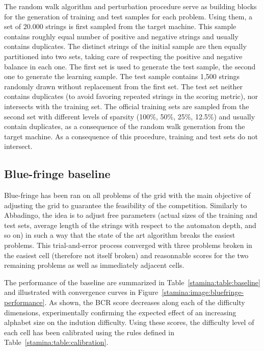 The random walk algorithm and perturbation procedure serve as building blocks for the generation of training and test samples for each problem. Using them, a set of 20.000 strings is first sampled from the target machine. This sample contains roughly equal number of positive and negative strings and usually contains duplicates. The distinct strings of the initial sample are then equally partitioned into two sets, taking care of respecting the positive and negative balance in each one. The first set is used to generate the test sample, the second one to generate the learning sample. The test sample contains 1,500 strings randomly drawn without replacement from the first set. The test set neither contains duplicates (to avoid favoring repeated strings in the scoring metric), nor intersects with the training set. The official training sets are sampled from the second set with different levels of sparsity (100\%, 50\%, 25\%, 12.5\%) and usually contain duplicates, as a consequence of the random walk generation from the target machine. As a consequence of this procedure, training and test sets do not intersect.

\subsection{Blue-fringe baseline\label{subsection:stamina-baseline}}

Blue-fringe has been ran on all problems of the grid with the main objective of adjusting the grid to guarantee the feasibility of the competition. Similarly to Abbadingo, the idea is to adjust free parameters (actual sizes of the training and test sets, average length of the strings with respect to the automaton depth, and so on) in such a way that the state of the art algorithm breaks the easiest problems. This trial-and-error process converged with three problems broken in the easiest cell (therefore not itself broken) and reasonnable scores for the two remaining problems as well as  immediately adjacent cells. 

The performance of the baseline are summarized in Table~\ref{stamina:table:baseline} and illustrated with convergence curves in Figure~\ref{stamina:image:bluefringe-performance}. As shown, the BCR score decreases along each of the difficulty dimensions, experimentally confirming the expected effect of an increasing alphabet size on the indution difficulty. Using these scores, the difficulty level of each cell has been calibrated using the rules defined in Table~\ref{stamina:table:calibration}.

